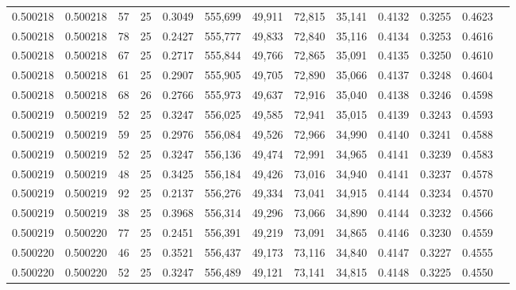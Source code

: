\begin{tabular}{rrrrrrrrrrrrr}
0.500218 & 0.500218 &    57 &  25 &                                     0.3049 & 555,699 &  49,911 &  72,815 &  35,141 & 0.4132 & 0.3255 & 0.4623 \\
0.500218 & 0.500218 &    78 &  25 &                                     0.2427 & 555,777 &  49,833 &  72,840 &  35,116 & 0.4134 & 0.3253 & 0.4616 \\
0.500218 & 0.500218 &    67 &  25 &                                     0.2717 & 555,844 &  49,766 &  72,865 &  35,091 & 0.4135 & 0.3250 & 0.4610 \\
0.500218 & 0.500218 &    61 &  25 &                                     0.2907 & 555,905 &  49,705 &  72,890 &  35,066 & 0.4137 & 0.3248 & 0.4604 \\
0.500218 & 0.500218 &    68 &  26 &                                     0.2766 & 555,973 &  49,637 &  72,916 &  35,040 & 0.4138 & 0.3246 & 0.4598 \\
0.500219 & 0.500219 &    52 &  25 &                                     0.3247 & 556,025 &  49,585 &  72,941 &  35,015 & 0.4139 & 0.3243 & 0.4593 \\
0.500219 & 0.500219 &    59 &  25 &                                     0.2976 & 556,084 &  49,526 &  72,966 &  34,990 & 0.4140 & 0.3241 & 0.4588 \\
0.500219 & 0.500219 &    52 &  25 &                                     0.3247 & 556,136 &  49,474 &  72,991 &  34,965 & 0.4141 & 0.3239 & 0.4583 \\
0.500219 & 0.500219 &    48 &  25 &                                     0.3425 & 556,184 &  49,426 &  73,016 &  34,940 & 0.4141 & 0.3237 & 0.4578 \\
0.500219 & 0.500219 &    92 &  25 &                                     0.2137 & 556,276 &  49,334 &  73,041 &  34,915 & 0.4144 & 0.3234 & 0.4570 \\
0.500219 & 0.500219 &    38 &  25 &                                     0.3968 & 556,314 &  49,296 &  73,066 &  34,890 & 0.4144 & 0.3232 & 0.4566 \\
0.500219 & 0.500220 &    77 &  25 &                                     0.2451 & 556,391 &  49,219 &  73,091 &  34,865 & 0.4146 & 0.3230 & 0.4559 \\
0.500220 & 0.500220 &    46 &  25 &                                     0.3521 & 556,437 &  49,173 &  73,116 &  34,840 & 0.4147 & 0.3227 & 0.4555 \\
0.500220 & 0.500220 &    52 &  25 &                                     0.3247 & 556,489 &  49,121 &  73,141 &  34,815 & 0.4148 & 0.3225 & 0.4550 \\

\end{tabular}
